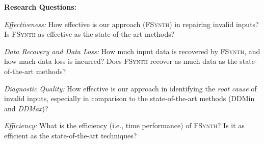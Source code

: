 \documentclass[sigconf,review,anonymous]{acmart}
\newcommand{\recheck}[1]{\textcolor{red}{#1}}
\newcommand{\revise}[1]{\textcolor{blue}{#1}}
\newcommand{\ddmin}{\textit{ddmin}\xspace}
\newcommand{\approach}{\textsc{FSynth}\xspace}
\def\ddmin{DDMin\xspace}
\newcommand{\ddmax}{\textit{DDMax}\xspace}
\begin{document}

\noindent\textbf{Research Questions:}
\begin{description}[wide, labelwidth=!, labelindent=0pt]
  \item[RQ1.] \emph{Effectiveness:}  %
How effective is our approach (\approach) in repairing invalid %
inputs? %
Is \approach %
as effective as %
the state-of-the-art methods? 

\item[RQ2.] \emph{Data Recovery and Data Loss:}
How much input data is recovered by \approach, and how much data loss is incurred?  Does \approach recover as much data as %
the state-of-the-art methods?


\item[RQ3.] \emph{Diagnostic Quality:}
How effective is our approach in identifying the \textit{root cause} of invalid inputs, especially in comparison to the state-of-the-art methods (\ddmin and \ddmax)?
%

\item[RQ4.] \emph{Efficiency:} %
What is the efficiency (i.e., time performance) of
\approach? Is it as efficient as %
the state-of-the-art %
techniques?
\end{description}
\end{document}
